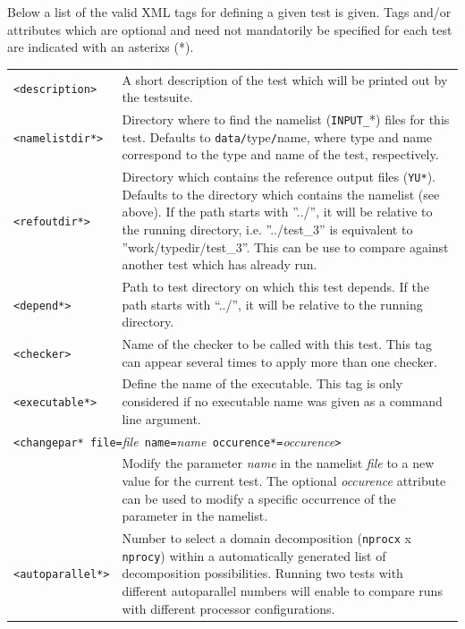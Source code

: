 \documentclass[12pt,twoside,a4paper]{report}
\newcommand{\tl}{\textless}
\newcommand{\tg}{\textgreater}
\newcommand{\tit}{\textit}
\begin{document}
Below a list of the valid XML tags for defining a given test is given. Tags and/or attributes which are optional and need not mandatorily be specified for each test are indicated with an asterixs (*).\\

\begin{tabular}{lp{12cm}}
\texttt{\tl description\tg} & A short description of the test which will be printed out by the testsuite.\\[1.2ex]
\texttt{\tl namelistdir*\tg} & Directory where to find the namelist (\texttt{INPUT\_}*) files for this test. Defaults to \texttt{data/}type\texttt{/}name, where type and name correspond to the type and name of the test, respectively.\\[1.2ex]
\texttt{\tl refoutdir*\tg} & Directory which contains the reference output files (\texttt{YU*}). Defaults to the directory which contains the namelist (see above). If the path starts with ''../'', it will be relative to the running directory, i.e. ''../test\_3'' is equivalent to ''work/typedir/test\_3''. This can be use to compare against another test which has already run.\\[1.2ex]
\texttt{\tl depend*\tg} & Path to test directory on which this test depends. If the path starts with ``../'', it will be relative to the running directory.\\[1.2ex]
\texttt{\tl checker\tg} & Name of the checker to be called with this test. This tag can appear several times to apply more than one checker.\\[1.2ex]
\texttt{\tl executable*\tg} & Define the name of the executable. This tag is only considered if no executable name was given as a command line argument.\\[1.2ex]
\multicolumn{2}{l}{\texttt{\tl changepar* file=}\tit{file}\texttt{ name=}\tit{name}\texttt{ occurence*=}\tit{occurence}\texttt{\tg}}\\
 & Modify the parameter \tit{name} in the namelist \tit{file} to a new value for the current test. The optional \tit{occurence}  attribute can be used to modify a specific occurrence of the parameter in the namelist.\\[1.2ex]
\texttt{\tl autoparallel*\tg} & Number to select a domain decomposition (\texttt{nprocx} x \texttt{nprocy}) within a automatically generated list of decomposition possibilities. Running two tests with different autoparallel numbers will enable to compare runs with different processor configurations.\\[1.2ex]
\end{tabular}
\end{document}
